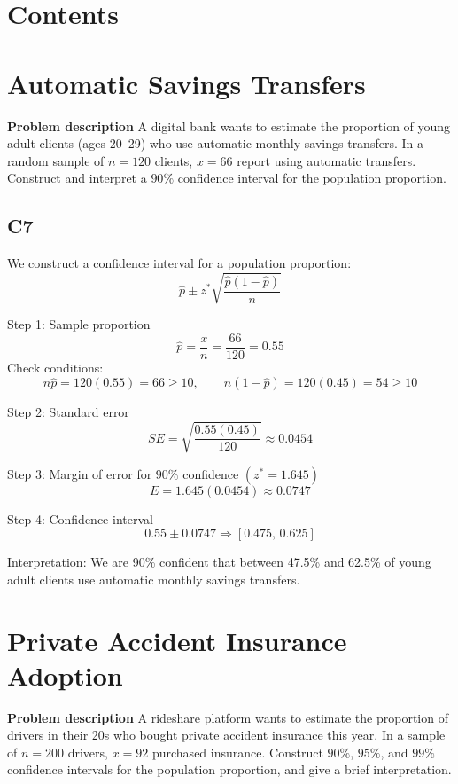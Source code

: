 

	\section*{Contents}
	\setcounter{tocdepth}{2}
	\setcounter{secnumdepth}{1}
	\tableofcontents
	\clearpage
	
	\section{Automatic Savings Transfers}
	\textbf{Problem description}
	A digital bank wants to estimate the proportion of young adult clients (ages 20--29) who use automatic monthly savings transfers. In a random sample of \(n=120\) clients, \(x=66\) report using automatic transfers. Construct and interpret a \(90\%\) confidence interval for the population proportion.
	
	\subsection*{C7}
	We construct a confidence interval for a population proportion:
	\[
	\hat p \pm z^*\sqrt{\frac{\hat p(1-\hat p)}{n}}
	\]
	
	Step 1: Sample proportion
	\[
	\hat p=\frac{x}{n}=\frac{66}{120}=0.55
	\]
	Check conditions:
	\[
	n\hat p=120(0.55)=66\ge 10,\qquad n(1-\hat p)=120(0.45)=54\ge 10
	\]
	
	Step 2: Standard error
	\[
	SE=\sqrt{\frac{0.55(0.45)}{120}}\approx 0.0454
	\]
	
	Step 3: Margin of error for \(90\%\) confidence \((z^*=1.645)\)
	\[
	E=1.645(0.0454)\approx 0.0747
	\]
	
	Step 4: Confidence interval
	\[
	0.55\pm 0.0747\Rightarrow [0.475,\,0.625]
	\]
	
	Interpretation: We are 90\% confident that between 47.5\% and 62.5\% of young adult clients use automatic monthly savings transfers.
	
	\section{Private Accident Insurance Adoption}
	\textbf{Problem description}
	A rideshare platform wants to estimate the proportion of drivers in their 20s who bought private accident insurance this year. In a sample of \(n=200\) drivers, \(x=92\) purchased insurance. Construct \(90\%\), \(95\%\), and \(99\%\) confidence intervals for the population proportion, and give a brief interpretation.
	
